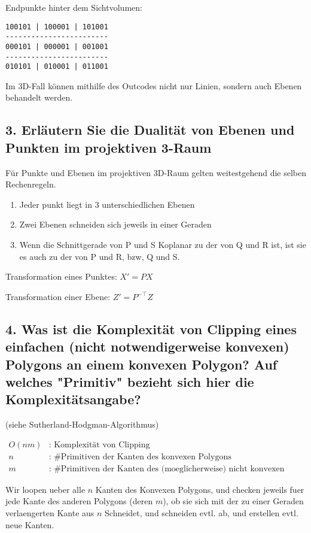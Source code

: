 \documentclass[a4paper,headings=small]{scrartcl}
\numberwithin{equation}{section} %
\numberwithin{figure}{section}   %
\begin{document}
Endpunkte hinter dem Sichtvolumen:
\begin{verbatim}
100101 | 100001 | 101001
------------------------
000101 | 000001 | 001001
------------------------
010101 | 010001 | 011001
\end{verbatim}

Im 3D-Fall können mithilfe des Outcodes nicht nur Linien, sondern auch Ebenen behandelt werden.

\subsection{3. Erläutern Sie die Dualität von Ebenen und Punkten im projektiven 3-Raum}
Für Punkte und Ebenen im projektiven 3D-Raum gelten weitestgehend die selben Rechenregeln.

\begin{enumerate}
\item Jeder punkt liegt in 3 unterschiedlichen Ebenen \\
\item Zwei Ebenen schneiden sich jeweils in einer Geraden \\
\item Wenn die Schnittgerade von P und S Koplanar zu der von Q und R ist,
  ist sie es auch zu der von P und R, bzw, Q und S.
\end{enumerate}

Transformation eines Punktes: $X' = P X$

Transformation einer Ebene: $Z' = P^{-\top} Z$

\subsection{4. Was ist die Komplexität von Clipping eines einfachen (nicht notwendigerweise konvexen) Polygons an einem konvexen Polygon? Auf welches "Primitiv" bezieht sich hier die Komplexitätsangabe?}

(siehe Sutherland-Hodgman-Algorithmus)

\begin{align*}
O(n m)& \text{: Komplexität von Clipping} \\
n& \text{: \# Primitiven der Kanten des konvexen Polygons} \\
m& \text{: \# Primitiven der Kanten des (moeglicherweise) nicht konvexen Polygons}
\end{align*}

Wir loopen ueber alle $n$ Kanten des Konvexen Polygons,
und checken jeweils fuer jede Kante des anderen Polygons (deren $m$),
ob sie sich mit der zu einer Geraden verlaengerten Kante aus $n$ Schneidet,
und schneiden evtl. ab, und erstellen evtl. neue Kanten.
\end{document}
